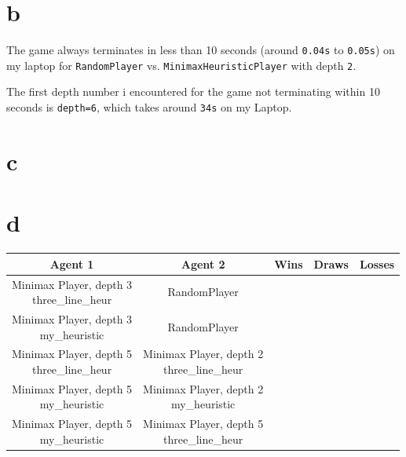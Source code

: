 \documentclass[12pt]{article}
\begin{document}
\newpage
\subsection{} 
\begin{enumerate}
	
\part{b} 
	
	The game always terminates in less than 10 seconds (around \texttt{0.04s} to \texttt{0.05s}) on my laptop for \texttt{RandomPlayer} vs. \texttt{MinimaxHeuristicPlayer} with depth \texttt{2}.
	
	The first depth number i encountered for the game not terminating within 10 seconds is \texttt{depth=6}, which takes around \texttt{34s} on my Laptop.

\part{c} 

\part{d}

	\begin{tabular}{|c|c|c|c|c|}
	\hline
 	Agent 1 & Agent 2 & Wins & Draws & Losses \\
	\hline
	\makecell{Minimax Player, depth 3 \\ three\_line\_heur} & RandomPlayer & & & \\
	\hline
	\makecell{Minimax Player, depth 3 \\ my\_heuristic} & RandomPlayer & & & \\
	\hline
	\makecell{Minimax Player, depth 5 \\ three\_line\_heur} & \makecell{Minimax Player, depth 2 \\ three\_line\_heur} & & & \\
	\hline
 	\makecell{Minimax Player, depth 5 \\ my\_heuristic} & \makecell{Minimax Player, depth 2 \\ my\_heuristic} & & & \\
	\hline
	\makecell{Minimax Player, depth 5 \\ my\_heuristic} & \makecell{Minimax Player, depth 5 \\ three\_line\_heur} & & & \\
	\hline
	\end{tabular}

\end{enumerate}
\end{document}
